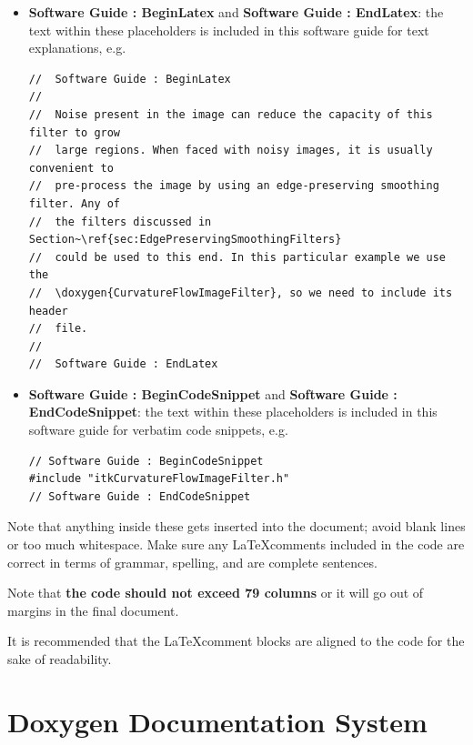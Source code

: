\begin{itemize}
\item \textbf{Software Guide : BeginLatex} and
\textbf{Software Guide : EndLatex}: the text within these placeholders is
included in this software guide for text explanations, e.g.

\small
\begin{verbatim}
//  Software Guide : BeginLatex
//
//  Noise present in the image can reduce the capacity of this filter to grow
//  large regions. When faced with noisy images, it is usually convenient to
//  pre-process the image by using an edge-preserving smoothing filter. Any of
//  the filters discussed in Section~\ref{sec:EdgePreservingSmoothingFilters}
//  could be used to this end. In this particular example we use the
//  \doxygen{CurvatureFlowImageFilter}, so we need to include its header
//  file.
//
//  Software Guide : EndLatex
\end{verbatim}
\normalsize

\item \textbf{Software Guide : BeginCodeSnippet} and
\textbf{Software Guide : EndCodeSnippet}: the text within these placeholders is
included in this software guide for verbatim code snippets, e.g.

\small
\begin{verbatim}
// Software Guide : BeginCodeSnippet
#include "itkCurvatureFlowImageFilter.h"
// Software Guide : EndCodeSnippet
\end{verbatim}
\normalsize

\end{itemize}

Note that anything inside these gets inserted into the document; avoid blank
lines or too much whitespace. Make sure any \LaTeX comments included in the
code are correct in terms of grammar, spelling, and are complete sentences.

Note that \textbf{the code should not exceed 79 columns} or it will go out of
margins in the final document.

It is recommended that the \LaTeX comment blocks are aligned to the code for
the sake of readability.


\section{Doxygen Documentation System}%
\label{sec:DoxygenDocumentationSystem}

